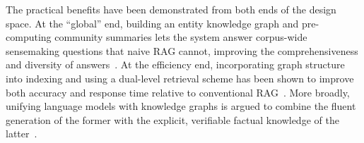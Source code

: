 The practical benefits have been demonstrated from both ends of the design space.
At the ``global'' end, building an entity knowledge graph and pre-computing
community summaries lets the system answer corpus-wide sensemaking questions that
naive RAG cannot, improving the comprehensiveness and diversity of
answers~\cite{edge2024graphrag}. At the efficiency end, incorporating graph
structure into indexing and using a dual-level retrieval scheme has been shown to
improve both accuracy and response time relative to conventional
RAG~\cite{guo2024lightrag}. More broadly, unifying language models with knowledge
graphs is argued to combine the fluent generation of the former with the
explicit, verifiable factual knowledge of the latter~\cite{pan2024unifying}.
